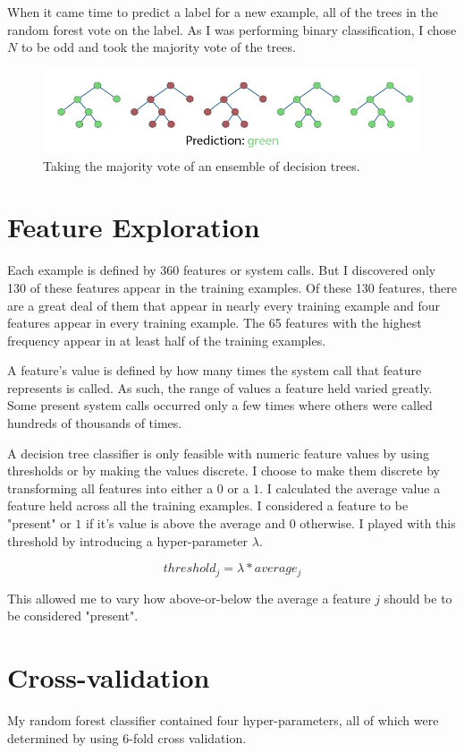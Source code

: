 \documentclass[a4paper, 11pt]{article} %
\begin{document}
When it came time to predict a label for a new example, all of the trees in the random forest vote on the label. As I was performing binary classification, I chose $N$ to be odd and took the majority vote of the trees.

\begin{figure} [H]
  \centerline{\includegraphics[width=0.8\linewidth]{decision_tree.png}}
  \caption{Taking the majority vote of an ensemble of decision trees.}
\end{figure}

\section*{Feature Exploration}

Each example is defined by 360 features or system calls. But I discovered only 130 of these features appear in the training examples. Of these 130 features, there are a great deal of them that appear in nearly every training example and four features appear in every training example. The 65 features with the highest frequency appear in at least half of the training examples.

A feature's value is defined by how many times the system call that feature represents is called. As such, the range of values a feature held varied greatly. Some present system calls occurred only a few times where others were called hundreds of thousands of times.

A decision tree classifier is only feasible with numeric feature values by using thresholds or by making the values discrete. I choose to make them discrete by transforming all features into either a $0$ or a $1$. I calculated the average value a feature held across all the training examples. I considered a feature to be "present" or $1$ if it's value is above the average and $0$ otherwise. I played with this threshold by introducing a hyper-parameter $\lambda$.

$$threshold_j = \lambda * average_j$$

This allowed me to vary how above-or-below the average a feature $j$ should be to be considered "present".

\section*{Cross-validation}
My random forest classifier contained four hyper-parameters, all of which were determined by using 6-fold cross validation.
\end{document}
